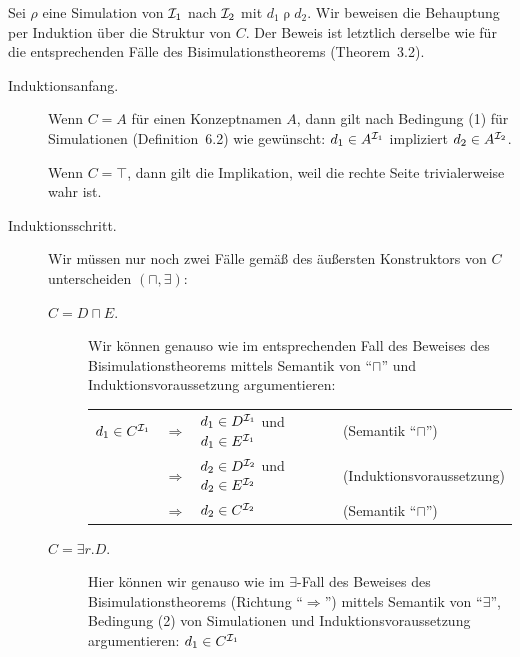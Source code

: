 \documentclass[fontsize=11pt, twoside=false, numbers=autoenddot]{scrbook}
\begin{document}
\par\noindent
\begin{beweis}
  Sei $\rho$ eine Simulation von $\mathcal{I}_1$ nach $\mathcal{I}_2$ mit $d_1\mathrel{\rho} d_2$.
  Wir beweisen die Behauptung per Induktion über die Struktur von $C$.
  Der Beweis ist letztlich derselbe wie für die entsprechenden Fälle
  des Bisimulationstheorems (Theorem~3.2).
  \begin{description}
    \item[Induktionsanfang.]
      Wenn $C=A$ für einen Konzeptnamen $A$,
      dann gilt 
      nach Bedingung (1) für Simulationen (Definition~6.2) wie gewünscht:
      $d_1 \in A^{\mathcal{I}_1}$ impliziert $d_2 \in A^{\mathcal{I}_2}$.
      
      Wenn $C=\top$, dann gilt die Implikation, weil die rechte Seite trivialerweise wahr ist.
    \item[Induktionsschritt.]
      Wir müssen nur noch zwei Fälle gemäß des äußersten Konstruktors
      von $C$ unterscheiden $(\sqcap,\exists)$:
      \begin{description}
        \item[{\boldmath $C=D \sqcap E$.}]
          Wir können genauso wie im entsprechenden Fall des Beweises des Bisimulationstheorems
          mittels Semantik von "`$\sqcap$"' und Induktionsvoraussetzung argumentieren:
          ~ %
          \parI
          \begin{center}
            \begin{tabular}{@{}llp{40mm}l@{}}
              $d_1 \in C^{\mathcal{I}_1}$
              & $\Rightarrow$ & $d_1 \in D^{\mathcal{I}_1}$ und $d_1 \in E^{\mathcal{I}_1}$ & (Semantik "`$\sqcap$"') \\
              & $\Rightarrow$ & $d_2 \in D^{\mathcal{I}_2}$ und $d_2 \in E^{\mathcal{I}_2}$ & (Induktionsvoraussetzung)\\
              & $\Rightarrow$ & $d_2 \in C^{\mathcal{I}_2}$                          & (Semantik "`$\sqcap$"')
            \end{tabular}
          \end{center}
          \parI
        \item[{\boldmath $C=\exists r.D$.}]
          Hier können wir genauso wie im $\exists$-Fall des Beweises des Bisimulationstheorems
          (Richtung "`$\Rightarrow$"') mittels Semantik von "`$\exists$"', Bedingung (2) von Simulationen und Induktionsvoraussetzung argumentieren:
          \parIII
          $d_1 \in C^{\mathcal{I}_1}$ \\

\end{description}
\end{description}
\end{beweis}
\end{document}

